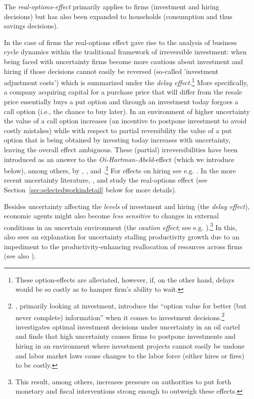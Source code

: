 \documentclass[a4paper,11pt,listof=nochaptergap,oneside,pointednumbers,bibtotoc,bigheadings,liststotoc]{scrbook}
\theoremstyle{mysatz}
\theoremstyle{mydefinition}
\theoremstyle{mytheorem}
\theoremstyle{mybemerkung}
\begin{document}
The \textit{real-options-effect} primarily applies to firms (investment and hiring decisions) but has also been expanded to households (consumption and thus savings decisions). 

In the case of firms the real-options effect gave rise to the analysis of business cycle dynamics within the traditional framework of irreversible investment: when being faced with uncertainty firms become more cautious about investment and hiring if those decisions cannot easily be reversed (so-called 'investment adjustment costs') which is summarized under the \textit{delay effect}.\footnote{These option-effects are alleviated, however, if, on the other hand, delays would be so costly as to hamper firm's ability to wait.} More specifically, a company acquiring capital for a purchase price that will differ from the resale price essentially buys a put option and through an investment today forgoes a call option (i.e., the chance to buy later). In an environment of higher uncertainty the value of a call option increases (an incentive to postpone investment to avoid costly mistakes) while with respect to partial reversibility the value of a put option that is being obtained by investing today increases with uncertainty, leaving the overall effect ambiguous. These (partial) irreversibilities have been introduced as an answer to the \textit{Oi-Hartman-Abeld}-effect (which we introduce below), among others, by \citet{dixitandpindyck:94}, \citet{bernanke:83}, \citet{abelandeberly:96} and \citet{siegel:86}.\footnote{\citet{dixitandpindyck:94}, primarily looking at investment, introduce the ``option value for better (but never complete) information'' when it comes to investment decisions.\footnote{In fact, the term 'options-effect' in this context borrows from an analogy of option theory in finance.} \citet{bernanke:83} investigates optimal investment decisions under uncertainty in an oil cartel and finds that high uncertainty causes firms to postpone investments and hiring in an environment where investment projects cannot easily be undone and labor market laws cause changes to the labor force (either hires or fires) to be costly.} For effects on hiring see e.g. \citet{bentoliliaandbertola:90} . In the more recent uncertainty literature, \citet{bloom:09}, \citet{bloometal:12} and \citet{schaal:17} study the real-options effect (see Section~\ref{sec:selectedworkindetail} below for more details).

Besides uncertainty affecting the \textit{levels} of investment and hiring (the \textit{delay effect}), economic agents might also become \textit{less sensitive} to changes in external conditions in an uncertain environment (the \textit{caution effect}; see e.g. \citealp{bloom:09}).\footnote{This result, among others, increases pressure on authorities to put forth monetary and fiscal interventions strong enough to outweigh these effects.} In this, \citet{bloom:14} also sees an explanation for uncertainty stalling productivity growth due to an impediment to the productivity-enhancing reallocation of resources across firms (see also \citealp{bloometal:12}).\\
\end{document}
